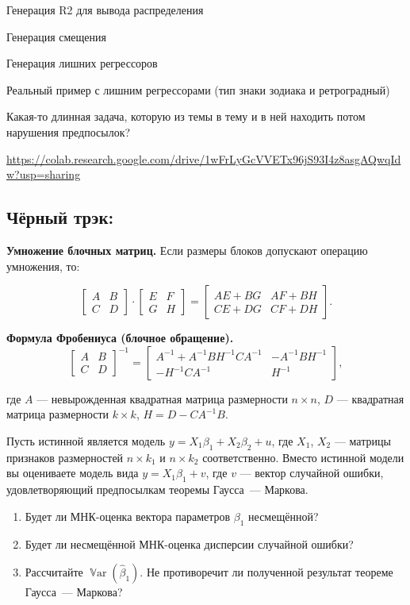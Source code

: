 \documentclass[12pt]{article}
\DeclareMathOperator{\Var}{\mathbb{V}ar}
\renewcommand{\b}{\beta}
\newcommand{\hb}{\hat{\beta}}
\begin{document}
Генерация R2 для вывода распределения

Генерация смещения

Генерация лишних регрессоров

Реальный пример с лишним регрессорами (тип знаки зодиака и ретроградный)

Какая-то длинная задача, которую из темы в тему и в ней находить потом нарушения предпосылок?



\url{https://colab.research.google.com/drive/1wFrLyGcVVETx96jS93I4z8asgAQwqIdw?usp=sharing}

\subsection{Чёрный трэк:}

\textbf{Умножение блочных матриц.} Если размеры блоков допускают операцию умножения, то:

\[
\left[
\begin{array}{c|c}
A & B \\
\hline
C & D
\end{array}
\right]
\cdot
\left[
\begin{array}{c|c}
E & F \\
\hline
G & H
\end{array}
\right]
=
\left[
\begin{array}{c|c}
AE + BG &  AF+BH\\
\hline
CE+DG & CF+DH
\end{array}
\right].
\]

\bigskip

\textbf{Формула Фробениуса (блочное обращение).}
\[
\left[
\begin{array}{c|c}
A & B \\
\hline
C & D
\end{array}
\right]^{-1}=
\left[
\begin{array}{c|c}
A^{-1}+A^{-1}BH^{-1}CA^{-1} & -A^{-1}BH^{-1} \\
\hline
-H^{-1}CA^{-1} & H^{-1}
\end{array}
\right],
\]

где $A$ — невырожденная квадратная матрица размерности $n \times n$, $D$ — квадратная матрица размерности $k \times k$, $H = D - CA^{-1}B$.

\begin{problem}
Пусть истинной является модель $y = X_1\b_1+ X_2\b_2+u$, где $X_1$, $X_2$  — матрицы признаков размерностей $n \times k_1$ и $n \times k_2$ соответственно. Вместо истинной модели вы оцениваете модель вида $y = X_1\b_1+v$, где $v$ — вектор случайной ошибки, удовлетворяющий предпосылкам теоремы Гаусса~— Маркова.
\begin{enumerate}
    \item Будет ли МНК-оценка вектора параметров $\b_1$ несмещённой?
    \item Будет ли несмещённой МНК-оценка дисперсии случайной ошибки?
    \item Рассчитайте $\Var(\hb_1)$. Не противоречит ли полученной результат теореме Гаусса~— Маркова?
\end{enumerate}
\end{problem}
\end{document}
